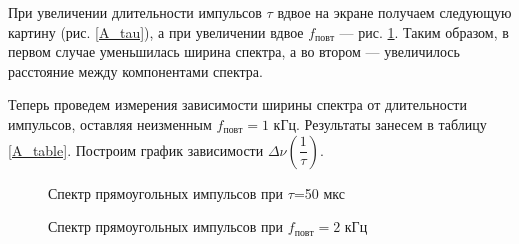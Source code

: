 \documentclass[12pt]{kiarticle}
\begin{document}
  При увеличении длительности импульсов $ \tau $ вдвое на экране получаем следующую картину (рис. \ref{A_tau}), а при увеличении вдвое $ f_{повт} $ --- рис. \ref{A_f}. Таким образом, в первом случае уменьшилась ширина спектра, а во втором --- увеличилось расстояние между компонентами спектра.
  
  Теперь проведем измерения зависимости ширины спектра от длительности импульсов, оставляя неизменным $ f_{повт} = 1 $ кГц. Результаты занесем в таблицу \ref{A_table}. Построим график зависимости $ \Delta \nu \left (\dfrac{1} {\tau} \right ) $. 
  \begin{figure}[h!]
  	\begin{minipage}[h]{0.5\linewidth}
  		\caption{Спектр прямоугольных импульсов при $\tau$=50 мкс}
  		\label{A_tau}
  	\end{minipage}
  	\begin{minipage}[h]{0.5\linewidth}
  		\caption{Спектр прямоугольных импульсов при $f_{повт}=2$ кГц}
  		\label{A_f}
  	\end{minipage}
  \end{figure}
  	
\end{document}
